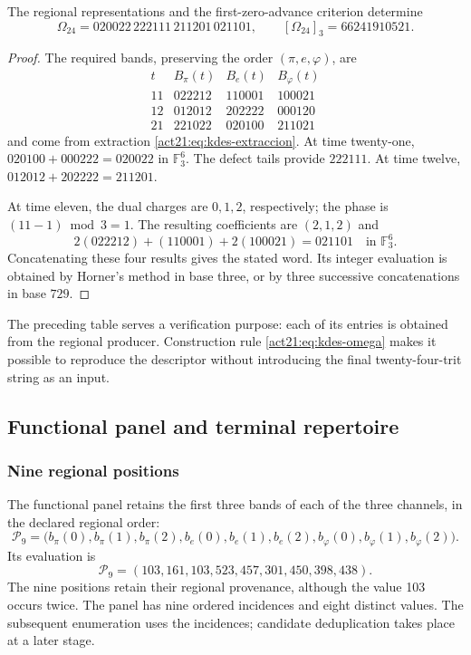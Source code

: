\begin{proposition}
The regional representations and the first-zero-advance criterion
determine
\[
 \Omega_{24}=020022\,222111\,211201\,021101,
 \qquad [\Omega_{24}]_3=66241910521.
\]
\end{proposition}
\begin{proof}
The required bands, preserving the order $(\pi,e,\varphi)$, are
\[
 \begin{array}{c|ccc}
 t&B_\pi(t)&B_e(t)&B_\varphi(t)\\\hline
 11&022212&110001&100021\\
 12&012012&202222&000120\\
 21&221022&020100&211021
 \end{array}
\]
and come from extraction \eqref{act21:eq:kdes-extraccion}. At time
twenty-one,
$020100+000222=020022$ in $\mathbb F_3^6$. The defect tails
provide $222111$. At time twelve,
$012012+202222=211201$.

At time eleven, the dual charges are $0,1,2$, respectively;
the phase is $(11-1)\bmod3=1$. The resulting coefficients are $(2,1,2)$ and
\[
 2(022212)+(110001)+2(100021)=021101
 \quad\text{in }\mathbb F_3^6.
\]
Concatenating these four results gives the stated word.
Its integer evaluation is obtained by Horner's method in base three, or by three
successive concatenations in base $729$.
\end{proof}

The preceding table serves a verification purpose: each of its
entries is obtained from the regional producer. Construction rule
\eqref{act21:eq:kdes-omega} makes it possible to reproduce the descriptor without
introducing the final twenty-four-trit string as an input.

\subsection{Functional panel and terminal repertoire}

\subsubsection{Nine regional positions}

The functional panel retains the first three bands of each of the
three channels, in the declared regional order:
\begin{equation}
 \mathcal P_9=
 \bigl(b_\pi(0),b_\pi(1),b_\pi(2),
       b_e(0),b_e(1),b_e(2),
       b_\varphi(0),b_\varphi(1),b_\varphi(2)\bigr).
 \label{act21:eq:kdes-panel}
\end{equation}
Its evaluation is
\[
 \mathcal P_9=(103,161,103,523,457,301,450,398,438).
\]
The nine positions retain their regional provenance, although the value
103 occurs twice. The panel has nine ordered incidences and
eight distinct values. The subsequent enumeration uses the incidences;
candidate deduplication takes place at a later stage.

